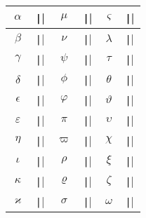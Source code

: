 \begin{frame}
	\begin{columns}
		\begin{column}{.54\paperwidth}
			\begin{table}[ht!]
				\centering
				\begin{tabular}{|cl|cl|cl|}
					\hline
					$\alpha$      & \texttt|\alpha|      & $\mu$     & \texttt|\mu|     & $\varsigma$ & \texttt|\varsigma| \\
					\hline
					$\beta$       & \texttt|\beta|       & $\nu$     & \texttt|\nu|     & $\lambda$   & \texttt|\lambda|   \\
					\hline
					$\gamma$      & \texttt|\gamma|      & $\psi$    & \texttt|\psi|    & $\tau$      & \texttt|\tau|      \\
					\hline
					$\delta$      & \texttt|\delta|      & $\phi$    & \texttt|\phi|    & $\theta$    & \texttt|\theta|    \\
					\hline
					$\epsilon$    & \texttt|\epsilon|    & $\varphi$ & \texttt|\varphi| & $\vartheta$ & \texttt|\vartheta| \\
					\hline
					$\varepsilon$ & \texttt|\varepsilon| & $\pi$     & \texttt|\pi|     & $\upsilon$  & \texttt|\upsilon|  \\
					\hline
					$\eta$        & \texttt|\eta|        & $\varpi$  & \texttt|\varpi|  & $\chi$      & \texttt|\chi|      \\
					\hline
					$\iota$       & \texttt|\iota|       & $\rho$    & \texttt|\rho|    & $\xi$       & \texttt|\xi|       \\
					\hline
					$\kappa$      & \texttt|\kappa|      & $\varrho$ & \texttt|\varrho| & $\zeta$     & \texttt|\zeta|     \\
					\hline
					$\varkappa$   & \texttt|\varkappa|   & $\sigma$  & \texttt|\sigma|  & $\omega$    & \texttt|\omega|    \\
					\hline
				\end{tabular}
			\end{table}
		\end{column}
		\begin{column}{.36\paperwidth}
			\begin{table}[ht!]
				\centering
				\begin{tabular}{|cl|cl|}

\end{tabular}
\end{table}
\end{column}
\end{columns}
\end{frame}
